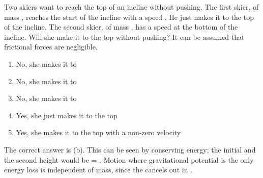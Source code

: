 
\begin{problem}[A1987PIQ5a] %
{Two skiers want to reach the top of an incline without pushing. The first skier, of mass , reaches the start of the incline with a speed . He just makes it to the top of the incline. The second skier, of mass , has a speed  at the bottom of the incline. Will she make it to the top without pushing? It can be assumed that frictional forces are negligible.
\begin{enumerate}
	\item No, she makes it to 
	\item No, she makes it to  \answer
	\item No, she makes it to 
	\item Yes, she just makes it to the top
	\item Yes, she makes it to the top with a non-zero velocity
\end{enumerate}
}
{}
{The correct answer is (b). This can be seen by conserving energy; the initial  and the second height would be  = .
 Motion where gravitational potential is the only energy loss is independent of mass, since the  cancels out in .
}
\end{problem}
